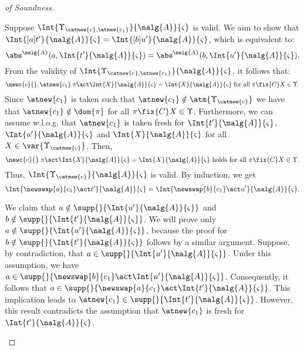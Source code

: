 \begin{proof}[of Soundness]
\begin{itemize}
           Suppose $\Int{\Upsilon_{\catnew{c},\atnew{c_1}}}{\nalg{A}}{\varsigma}$ is valid. We aim to show that $\Int{[a]t'}{\nalg{A}}{\varsigma} = \Int{[b]u'}{\nalg{A}}{\varsigma}$, which is equivalent to:
            \[
                \abs^{\nalg{A}}(a,\Int{t'}{\nalg{A}}{\varsigma}) = \abs^{\nalg{A}}(b,\Int{u'}{\nalg{A}}{\varsigma}).
            \]
            From the validity of $\Int{\Upsilon_{\catnew{c},\atnew{c_1}}}{\nalg{A}}{\varsigma}$, it follows that:
            \[
                \newc{c}{},\atnew{c_1}.\pi\act \Int{X}{\nalg{A}}{\varsigma} = \Int{X}{\nalg{A}}{\varsigma} \text{ for all } \pi\fix{C} X\in\Upsilon.
            \]
            Since $\atnew{c_1}$ is taken such that $\atnew{c_1}\notin\atm{\Upsilon_{\catnew{c}}}$ we have that $\atnew{c_1}\notin \dom{\pi}$ for all $\pi\fix{C} X\in \Upsilon$. Furthermore, we can assume w.l.o.g. that $\atnew{c_1}$ is taken fresh for $\Int{t'}{\nalg{A}}{\varsigma}$, $\Int{u'}{\nalg{A}}{\varsigma}$  and $\Int{X}{\nalg{A}}{\varsigma}$ for all $X\in \var{\Upsilon_{\catnew{c}}}$. Then,
           \[
                \newc{c}{}.\pi\act \Int{X}{\nalg{A}}{\varsigma} = \Int{X}{\nalg{A}}{\varsigma} \text{ holds for all } \pi\fix{C} X\in\Upsilon.
            \]
            Thus, $\Int{\Upsilon_{\catnew{c}}}{\nalg{A}}{\varsigma}$ is valid. By induction, we get
            \[
                \Int{\newswap{a}{c_1}\act t'}{\nalg{A}}{\varsigma} = \Int{\newswap{b}{c_1}\act u'}{\nalg{A}}{\varsigma}.
            \]

            \begin{claim}[1]
                We claim that $a\notin\supp{}{\Int{u'}{\nalg{A}}{\varsigma}}$ and $b\notin\supp{}{\Int{t'}{\nalg{A}}{\varsigma}}$.  We will prove only $a\notin\supp{}{\Int{u'}{\nalg{A}}{\varsigma}}$, because the proof for $b \notin\supp{}{\Int{t'}{\nalg{A}}{\varsigma}}$ follows by a similar argument. Suppose, by contradiction, that $a \in \supp{}{\Int{u'}{\nalg{A}}{\varsigma}}$. Under this assumption, we have $a \in \supp{}{\newswap{b}{c_1} \act \Int{u'}{\nalg{A}}{\varsigma}}$. Consequently, it follows that $a \in \supp{}{\newswap{a}{c_1} \act \Int{t'}{\nalg{A}}{\varsigma}}$. This implication leads to $\atnew{c_1} \in \supp{}{\Int{t'}{\nalg{A}}{\varsigma}}$. However, this result contradicts the assumption that $\atnew{c_1}$ is fresh for $\Int{t'}{\nalg{A}}{\varsigma}$. 
            \end{claim}


\end{itemize}
\end{proof}
